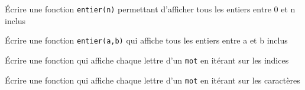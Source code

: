 	\begin{minipage}[t]{0.45\linewidth}
	\begin{exercice_cours}{Écrire une fonction \verb|entier(n)| permettant d'afficher tous les entiers entre 0 et n inclus}{}
	\end{exercice_cours}
	\end{minipage}\hspace{15pt}
	\begin{minipage}[t]{0.45\linewidth}
		\begin{exercice_cours}{Écrire une fonction \verb|entier(a,b)| qui affiche tous les entiers entre a et b inclus}{}
		\end{exercice_cours}
	\end{minipage}
	
	
	\begin{minipage}[t]{0.45\linewidth}
		\begin{exercice_cours}{Écrire une fonction qui affiche chaque lettre d'un \verb|mot|  en itérant sur les indices}{}
		\end{exercice_cours}
		\end{minipage}\hspace{15pt}
		\begin{minipage}[t]{0.45\linewidth}
		\begin{exercice_cours}{Écrire une fonction qui affiche chaque lettre d'un \verb|mot|  en itérant sur les caractères}{}
			\end{exercice_cours}
	
		\end{minipage}
	
	
	
